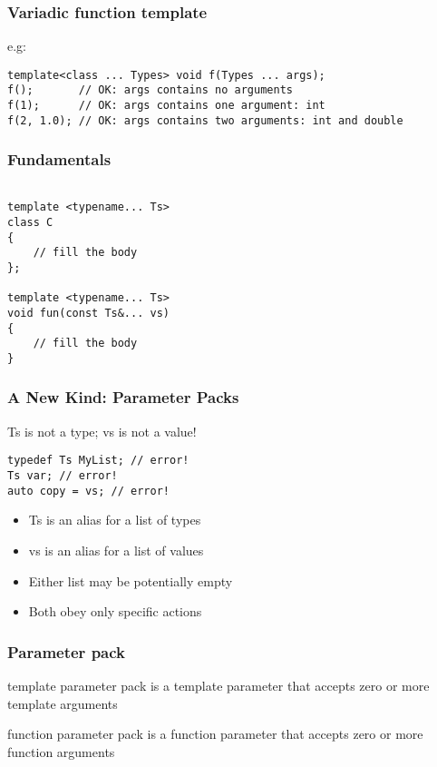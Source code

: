 \documentclass{beamer}
\begin{document}
\begin{frame}[fragile]
\frametitle{Variadic function template}


\begin{block}{e.g:}
\begin{lstlisting}
template<class ... Types> void f(Types ... args);
f();       // OK: args contains no arguments
f(1);      // OK: args contains one argument: int
f(2, 1.0); // OK: args contains two arguments: int and double
\end{lstlisting}
\end{block}

\end{frame}



\begin{frame}[fragile]
\frametitle{Fundamentals}

\begin{lstlisting}

template <typename... Ts>
class C
{
    // fill the body
};
 
template <typename... Ts>
void fun(const Ts&... vs)
{
    // fill the body
}

\end{lstlisting}

\end{frame}

\begin{frame}[fragile]
\frametitle{A New Kind: Parameter Packs}

Ts is not a type; vs is not a value!

\begin{lstlisting}
typedef Ts MyList; // error!
Ts var; // error!
auto copy = vs; // error!
\end{lstlisting}

\begin{itemize}
\item Ts is an alias for a list of types
\item vs is an alias for a list of values
\item Either list may be potentially empty
\item Both obey only specific actions
\end{itemize}

\end{frame}


\begin{frame}
\frametitle{Parameter pack}

\begin{block}{template parameter pack}
 is a template parameter that accepts zero or more template arguments
\end{block}

\begin{block}{function parameter pack}
 is a function parameter that accepts zero or more function arguments
\end{block}


\end{frame}
\end{document}
